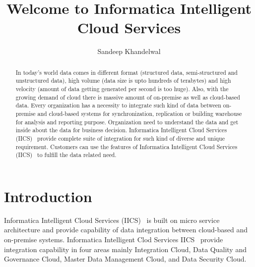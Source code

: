 \title{Welcome to Informatica Intelligent Cloud Services}

\author{Sandeep Khandelwal}

\renewcommand{\shortauthors}{S. Khandelwal}

\begin{abstract}
	
In today's world data comes in different format (structured data,
semi-structured and unstructured data), high volume (data size is upto
hundreds of terabytes) and high velocity (amount of data getting
generated per second is too huge). Also, with the growing demand of cloud there is massive amount of
on-premise as well as cloud-based data. Every organization has a necessity
to integrate such kind of data between on-premise and cloud-based
systems for synchronization, replication or building warehouse for
analysis and reporting purpose. Organization need to understand the data and get inside about the data for business decision. Informatica Intelligent Cloud Services
(IICS)~\cite{hid-sp18-511-iics} provide complete suite of integration
for such kind of diverse and unique requirement. Customers can use the features of Informatica Intelligent Cloud Services (IICS)~\cite{hid-sp18-511-iics} to fulfill the data related need.

\end{abstract}



\maketitle


\section{Introduction}

Informatica Intelligent Cloud Services (IICS)~\cite{hid-sp18-511-iics} is built on micro service
architecture and provide capability of data integration between
cloud-based and on-premise systems. Informatica Intelligent Clod
Services IICS~\cite{hid-sp18-511-iics} provide integration capability
in four areas mainly Integration Cloud, Data Quality and Governance
Cloud, Master Data Management Cloud, and Data Security Cloud.

